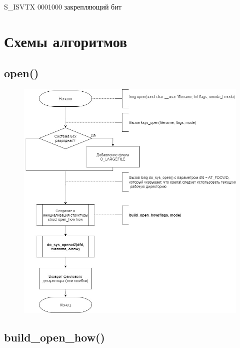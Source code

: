 \documentclass[a4paper,14pt]{extreport}
\begin{document}
S\_ISVTX  0001000 закрепляющий бит 






\chapter{Схемы алгоритмов}

\section{open()}

\begin{figure}[H]
	\centering
	\includegraphics[scale=0.6]{img/open.jpg}
\end{figure}




\clearpage
\section{build\_open\_how()}
\end{document}
